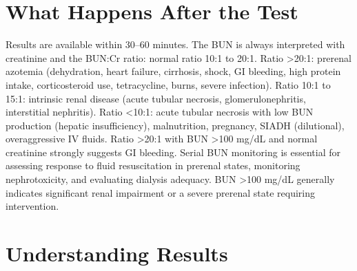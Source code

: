 \section*{What Happens After the Test}
Results are available within 30--60 minutes. The BUN is always interpreted with creatinine and the BUN:Cr ratio: normal ratio 10:1 to 20:1. Ratio >20:1: prerenal azotemia (dehydration, heart failure, cirrhosis, shock, GI bleeding, high protein intake, corticosteroid use, tetracycline, burns, severe infection). Ratio 10:1 to 15:1: intrinsic renal disease (acute tubular necrosis, glomerulonephritis, interstitial nephritis). Ratio <10:1: acute tubular necrosis with low BUN production (hepatic insufficiency), malnutrition, pregnancy, SIADH (dilutional), overaggressive IV fluids. Ratio >20:1 with BUN >100 mg/dL and normal creatinine strongly suggests GI bleeding. Serial BUN monitoring is essential for assessing response to fluid resuscitation in prerenal states, monitoring nephrotoxicity, and evaluating dialysis adequacy. BUN >100 mg/dL generally indicates significant renal impairment or a severe prerenal state requiring intervention.

\section*{Understanding Results}

